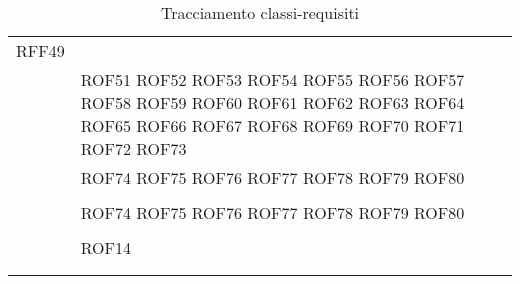 \documentclass[../DefinizioneDiProdotto_v3.0.0.tex]{subfiles}
\begin{document}
\begin{longtable}{p{8.5cm}!{\VRule[1pt]}p{2.5cm}}
	RFF49                           \\
	                                                                    & ROF51 \newline
	ROF52 \newline
	ROF53 \newline
	ROF54 \newline
	ROF55 \newline
	ROF56 \newline
	ROF57 \newline
	ROF58 \newline
	ROF59 \newline
	ROF60 \newline
	ROF61 \newline
	ROF62 \newline
	ROF63 \newline
	ROF64 \newline
	ROF65 \newline
	ROF66 \newline
	ROF67 \newline
	ROF68 \newline
	ROF69 \newline
	ROF70 \newline
	ROF71 \newline
	ROF72 \newline
	ROF73 \\
	                                                                       & ROF74 \newline
	ROF75 \newline
	ROF76 \newline
	ROF77 \newline
	ROF78 \newline
	ROF79 \newline
	ROF80 \newline
	 \\
	                                                                                         &                                  \\
	& ROF74 \newline
	ROF75 \newline
	ROF76 \newline
	ROF77 \newline
	ROF78 \newline
	ROF79 \newline
	ROF80 \newline
	 \\                                                                                &                                  \\
	             & ROF14                            \\
	                   &                                  \\
	\caption{Tracciamento classi-requisiti}
\end{longtable}
\end{document}
